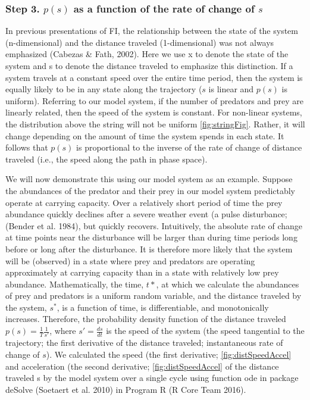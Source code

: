 \documentclass[12pt,twoside,openany]{reedthesis}
\begin{document}
\subsubsection{\texorpdfstring{\textbf{Step 3.} \(p(s)\) as a function
of the rate of change of
\(s\)}{Step 3. p(s) as a function of the rate of change of s}}\label{step-3.-ps-as-a-function-of-the-rate-of-change-of-s}

In previous presentations of FI, the relationship between the state of
the system (n-dimensional) and the distance traveled (1-dimensional) was
not always emphasized (Cabezas \& Fath, 2002). Here we use x to denote
the state of the system and s to denote the distance traveled to
emphasize this distinction. If a system travels at a constant speed over
the entire time period, then the system is equally likely to be in any
state along the trajectory (\(s\) is linear and \(p(s)\) is uniform).
Referring to our model system, if the number of predators and prey are
linearly related, then the speed of the system is constant. For
non-linear systems, the distribution above the string will not be
uniform \ref{fig:stringFig}. Rather, it will change depending on the
amount of time the system spends in each state. It follows that \(p(s)\)
is proportional to the inverse of the rate of change of distance
traveled (i.e., the speed along the path in phase space).

We will now demonstrate this using our model system as an example.
Suppose the abundances of the predator and their prey in our model
system predictably operate at carrying capacity. Over a relatively short
period of time the prey abundance quickly declines after a severe
weather event (a pulse disturbance; (Bender et al. 1984), but quickly
recovers. Intuitively, the absolute rate of change at time points near
the disturbance will be larger than during time periods long before or
long after the disturbance. It is therefore more likely that the system
will be (observed) in a state where prey and predators are operating
approximately at carrying capacity than in a state with relatively low
prey abundance. Mathematically, the time, \(t*\), at which we calculate
the abundances of prey and predators is a uniform random variable, and
the distance traveled by the system, \(s^*\), is a function of time, is
differentiable, and monotonically increases. Therefore, the probability
density function of the distance traveled
\(p(s)=\frac{1}{T}\frac{1}{s'}\), where \(s'= \frac{ds}{dt}\) is the
speed of the system (the speed tangential to the trajectory; the first
derivative of the distance traveled; instantaneous rate of change of
\(s\)). We calculated the speed (the first derivative;
\ref{fig:distSpeedAccel} and acceleration (the second derivative;
\ref{fig:distSpeedAccel} of the distance traveled s by the model system
over a single cycle using function ode in package deSolve (Soetaert et
al. 2010) in Program R (R Core Team 2016).
\end{document}
